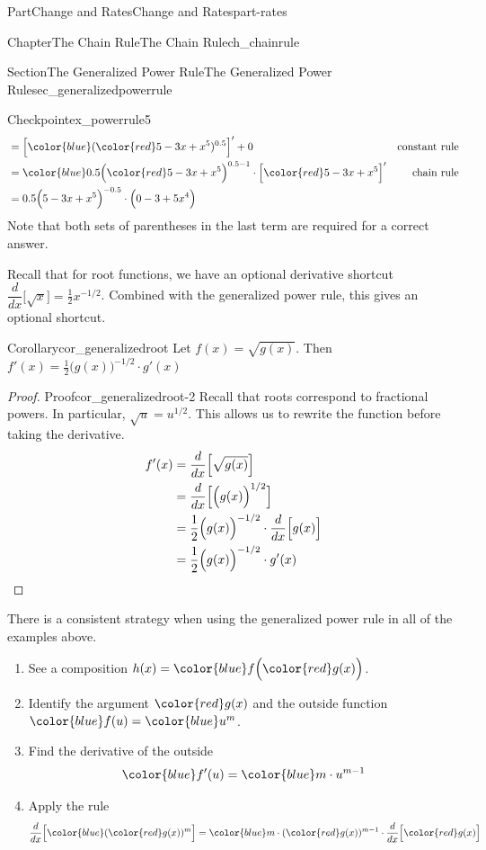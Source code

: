 \documentclass[oneside,10pt,]{tufte-book}
\numberwithin{equation}{chapter}
\newcommand{\qedhere}{\relax}
\newcommand{\red}[1]{   {\color{red}   #1}   }
\newcommand{\blue}[1]{  {\color{blue}  #1}  }
\newcommand{\ddx}[1]{ \dfrac{d}{dx} \Big[ #1 \Big]  }
\newcommand{\D}[1]{ \Big[ #1 \Big]'  }
\newcommand{\amp}{&}
\begin{document}
\begin{partptx}{Part}{Change and Rates}{}{Change and Rates}{}{}{part-rates}
\begin{chapterptx}{Chapter}{The Chain Rule}{}{The Chain Rule}{}{}{ch_chainrule}
\begin{sectionptx}{Section}{The Generalized Power Rule}{}{The Generalized Power Rule}{}{}{sec_generalizedpowerrule}
\begin{inlineexercise}{Checkpoint}{}{ex_powerrule5}
\begin{align*}
\amp =  \D{ \blue{(\red{5-3x+x^5})^{0.5}} }  + 0 \amp \text{constant  rule} \\
\amp = \blue{0.5 \Big(\red{5-3x+x^5}\Big)^{0.5-1}}\cdot\D{\red{5-3x+x^5}} \amp \text{chain rule} \\
\amp = 0.5 \Big( 5-3x+x^5 \Big)^{-0.5}\cdot\Big( 0-3+5x^4\Big) 
\end{align*}
Note that both sets of parentheses in the last term are required for a correct answer.%
\end{inlineexercise}%
Recall that for root functions, we have an optional derivative shortcut \(\ddx{\sqrt{x}}=\frac{1}{2}x^{-1/2}\).  Combined with the generalized power rule, this gives an optional shortcut.%
\begin{corollary}{Corollary}{}{}{cor_generalizedroot}%
Let \(f(x) = \sqrt{g(x)}\). Then \(f'(x) = \frac{1}{2} \Big(g(x)\Big)^{-1/2}\cdot g'(x)\)%
\end{corollary}
\begin{proof}{Proof}{}{cor_generalizedroot-2}
Recall that roots correspond to fractional powers.  In particular, \(\sqrt{u} = u^{1/2}\).  This allows us to rewrite the function before taking the derivative.%
\begin{align*}
f'(x) \amp = \ddx{\sqrt{g(x)}}\\
\amp = \ddx{\Big(g(x)\Big)^{1/2}} \\
\amp = \frac{1}{2} \Big(g(x)\Big)^{-1/2}\cdot \ddx{g(x)}\\
\amp = \frac{1}{2} \Big(g(x)\Big)^{-1/2}\cdot g'(x)\qedhere
\end{align*}
%
\end{proof}
There is a consistent strategy when using the generalized power rule in all of the examples above.%
\begin{enumerate}
\item{}See a composition \(h(x) = \blue{ f\Big(\red{g(x)}\Big) } \).%
\item{}Identify the argument \(\red{g(x)}\) and the outside function \(\blue{f(u)} = \blue{u^m}\).%
\item{}Find the derivative of the outside%
\begin{equation*}
\blue{f'(u)} = \blue{m\cdot u^{m-1}}
\end{equation*}
%
\item{}Apply the rule%
\begin{equation*}
\ddx{\blue{ ( \red{g(x)} )^{m} } } 
= \blue{ m\cdot ( \red{g(x)} )^{m-1} }\cdot \ddx{ \red{g(x)} }
\end{equation*}
%
\end{enumerate}

\end{sectionptx}
\end{chapterptx}
\end{partptx}
\end{document}

